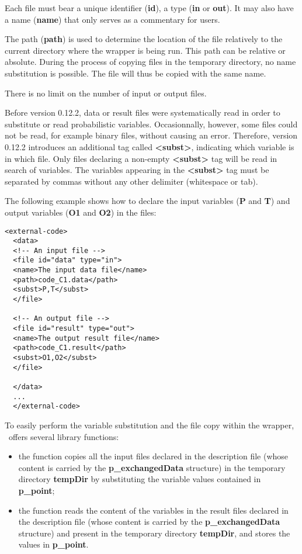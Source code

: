 Each file must bear a unique identifier ({\bf id}), a type ({\bf in} or {\bf out}). It may also have a name ({\bf name}) that only serves as a commentary for users.

The path ({\bf path}) is used to determine the location of the file relatively to the current directory where the wrapper is being run. This path can be relative or absolute. During the process of copying files in the temporary directory, no name substitution is possible. The file will thus be copied with the same name.

There is no limit on the number of input or output files.

Before version 0.12.2, data or result files were systematically read in order to substitute or read probabilistic variables. Occasionnally, however, some files could not be read, for example binary files, without causing an error. Therefore, version 0.12.2 introduces an additional tag called {\bf <subst>}, indicating which variable is in which file. Only files declaring a non-empty {\bf <subst>} tag will be read in search of variables. The variables appearing in the {\bf <subst>} tag must be separated by commas without any other delimiter (whitespace or tab).

The following example shows how to declare the input variables ({\bf P} and {\bf T}) and output variables ({\bf O1} and {\bf O2}) in the files:

\lstset{language=XML, basicstyle=\normalsize}
\begin{lstlisting}[frame=TBRL]
  <external-code>
  <data>
  <!-- An input file -->
  <file id="data" type="in">
  <name>The input data file</name>
  <path>code_C1.data</path>
  <subst>P,T</subst>
  </file>

  <!-- An output file -->
  <file id="result" type="out">
  <name>The output result file</name>
  <path>code_C1.result</path>
  <subst>O1,O2</subst>
  </file>

  </data>
  ...
  </external-code>
\end{lstlisting}

To easily perform the variable substitution and the file copy within the wrapper, \OT\ offers several library functions:
\begin{itemize}
\item the  function copies all the input files declared in the description file (whose content is carried by the {\bf p\_exchangedData} structure) in the temporary directory {\bf tempDir} by substituting the variable values contained in {\bf p\_point};
\item the  function reads the content of the variables in the result files declared in the description file (whose content is carried by the {\bf p\_exchangedData} structure) and present in the temporary directory {\bf tempDir}, and stores the values in {\bf p\_point}.
\end{itemize}

